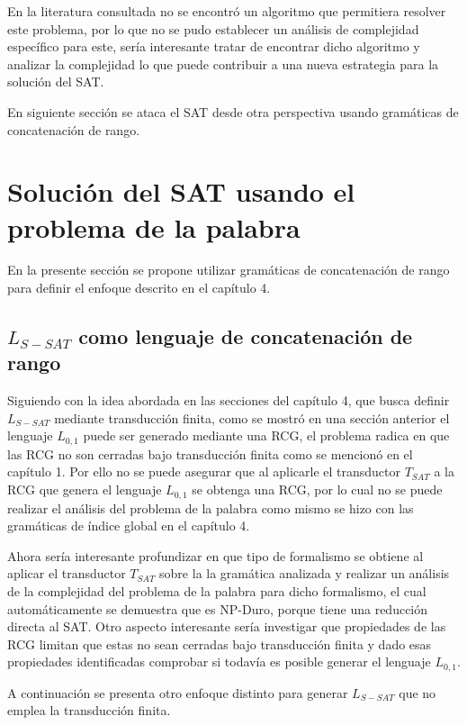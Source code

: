 En la literatura consultada no se encontró un algoritmo que permitiera resolver este problema, por lo que no se pudo establecer
un análisis de complejidad específico para este, sería interesante tratar de encontrar dicho algoritmo y analizar
la complejidad lo que puede contribuir a una nueva estrategia para la solución del SAT.

En siguiente sección se ataca el SAT desde otra perspectiva usando gramáticas de concatenación de rango.

\section{Solución del SAT usando el problema de la palabra}

En la presente sección se propone utilizar gramáticas de concatenación de rango para definir el enfoque descrito en el
capítulo 4.

\subsection{$L_{S-SAT}$ como lenguaje de concatenación de rango}

Siguiendo con la idea abordada en las secciones del capítulo 4, que busca definir $L_{S-SAT}$ mediante transducción finita,
como se mostró en una sección anterior el lenguaje $L_{0,1}$ puede ser generado mediante una RCG, el problema radica en que las RCG
no son cerradas bajo transducción finita como se mencionó en el capítulo 1. Por ello no se puede asegurar que al aplicarle el
transductor $T_{SAT}$ a la RCG que genera el lenguaje $L_{0,1}$ se obtenga una RCG, por lo cual no se puede realizar el análisis
del problema de la palabra como mismo se hizo con las gramáticas de índice global en el capítulo 4.

Ahora sería interesante profundizar en que tipo de formalismo se obtiene al aplicar el transductor $T_{SAT}$ sobre la
la gramática analizada y realizar un análisis de la complejidad del problema de la palabra para dicho formalismo, el cual
automáticamente se demuestra que es NP-Duro, porque tiene una reducción directa al SAT. Otro aspecto interesante
sería investigar que propiedades de las RCG limitan que estas no sean cerradas bajo transducción finita y dado esas
propiedades identificadas comprobar si todavía es posible generar el lenguaje $L_{0,1}$.

A continuación se presenta otro enfoque distinto para generar $L_{S-SAT}$ que no emplea la transducción finita.

